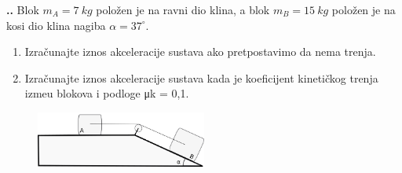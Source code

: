 

\noindent 
\textbf{
\thecjelina.\thezadatak.}
Blok $m_A = 7\ kg$ položen je na ravni dio klina, a blok $m_B = 15\ kg$ polo\v{z}en je na kosi dio
klina nagiba $\alpha = 37^\circ$.
\begin{enumerate}[label=\alph*)]
 \item Izra\v{c}unajte iznos akceleracije sustava ako pretpostavimo da nema trenja.
 \item Izra\v{c}unajte iznos akceleracije sustava kada je koeficijent kineti\v{c}kog trenja izme\dj{}u
blokova i podloge μk = 0,1.
\end{enumerate}
\begin{figure}[h]%
  \begin{center}
    \includegraphics[width=0.5\textwidth]{Dinamika_materijalne_tocke/stol_i_kosina.png}
  \end{center}
\end{figure}

